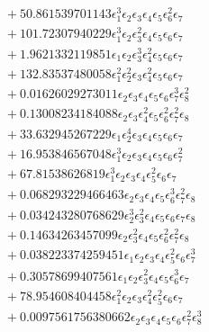 \documentclass[10pt]{article}
\begin{document}
\begin{align*}
&{}  + 50.861539701143 \epsilon_{1}^{3} \epsilon_{2} \epsilon_{3} \epsilon_{4} \epsilon_{5} \epsilon_{6}^{2} \epsilon_{7} \\
&{}  + 101.72307940229 \epsilon_{1}^{3} \epsilon_{2} \epsilon_{3}^{2} \epsilon_{4} \epsilon_{5} \epsilon_{6} \epsilon_{7} \\
&{}  + 1.9621332119851 \epsilon_{1} \epsilon_{2} \epsilon_{3}^{3} \epsilon_{4}^{2} \epsilon_{5} \epsilon_{6} \epsilon_{7} \\
&{}  + 132.83537480058 \epsilon_{1}^{2} \epsilon_{2}^{2} \epsilon_{3} \epsilon_{4}^{2} \epsilon_{5} \epsilon_{6} \epsilon_{7} \\
&{}  + 0.01626029273011 \epsilon_{2} \epsilon_{3} \epsilon_{4} \epsilon_{5} \epsilon_{6} \epsilon_{7}^{3} \epsilon_{8}^{2} \\
&{}  + 0.13008234184088 \epsilon_{2} \epsilon_{3} \epsilon_{4}^{2} \epsilon_{5} \epsilon_{6}^{2} \epsilon_{7}^{2} \epsilon_{8} \\
&{}  + 33.632945267229 \epsilon_{1} \epsilon_{2}^{4} \epsilon_{3} \epsilon_{4} \epsilon_{5} \epsilon_{6} \epsilon_{7} \\
&{}  + 16.953846567048 \epsilon_{1}^{3} \epsilon_{2} \epsilon_{3} \epsilon_{4} \epsilon_{5} \epsilon_{6} \epsilon_{7}^{2} \\
&{}  + 67.81538626819 \epsilon_{1}^{3} \epsilon_{2} \epsilon_{3} \epsilon_{4} \epsilon_{5}^{2} \epsilon_{6} \epsilon_{7} \\
&{}  + 0.068293229466463 \epsilon_{2} \epsilon_{3} \epsilon_{4} \epsilon_{5} \epsilon_{6}^{3} \epsilon_{7}^{2} \epsilon_{8} \\
&{}  + 0.034243280768629 \epsilon_{2}^{3} \epsilon_{3}^{2} \epsilon_{4} \epsilon_{5} \epsilon_{6} \epsilon_{7} \epsilon_{8} \\
&{}  + 0.14634263457099 \epsilon_{2} \epsilon_{3}^{2} \epsilon_{4} \epsilon_{5} \epsilon_{6}^{2} \epsilon_{7}^{2} \epsilon_{8} \\
&{}  + 0.038223374259451 \epsilon_{1} \epsilon_{2} \epsilon_{3} \epsilon_{4} \epsilon_{5}^{2} \epsilon_{6} \epsilon_{7}^{3} \\
&{}  + 0.30578699407561 \epsilon_{1} \epsilon_{2} \epsilon_{3}^{2} \epsilon_{4} \epsilon_{5} \epsilon_{6}^{3} \epsilon_{7} \\
&{}  + 78.954608404458 \epsilon_{1}^{2} \epsilon_{2} \epsilon_{3} \epsilon_{4}^{2} \epsilon_{5}^{2} \epsilon_{6} \epsilon_{7} \\
&{}  + 0.0097561756380662 \epsilon_{2} \epsilon_{3} \epsilon_{4} \epsilon_{5} \epsilon_{6} \epsilon_{7}^{2} \epsilon_{8}^{3} \\

\end{align*}
\end{document}
